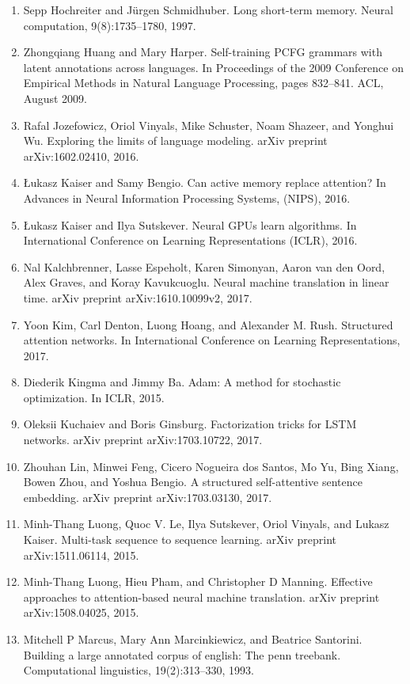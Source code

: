 \documentclass[11pt,UTF8,fontset=fandol]{ctexart}
\begin{document}
\begin{enumerate}[leftmargin=2.4em,labelsep=0.6em,itemsep=0.15em]
\item Sepp Hochreiter and J\"urgen Schmidhuber. Long short-term memory. Neural computation, 9(8):1735--1780, 1997.
\item Zhongqiang Huang and Mary Harper. Self-training PCFG grammars with latent annotations across languages. In Proceedings of the 2009 Conference on Empirical Methods in Natural Language Processing, pages 832--841. ACL, August 2009.
\item Rafal Jozefowicz, Oriol Vinyals, Mike Schuster, Noam Shazeer, and Yonghui Wu. Exploring the limits of language modeling. arXiv preprint arXiv:1602.02410, 2016.
\item {\L}ukasz Kaiser and Samy Bengio. Can active memory replace attention? In Advances in Neural Information Processing Systems, (NIPS), 2016.
\item {\L}ukasz Kaiser and Ilya Sutskever. Neural GPUs learn algorithms. In International Conference on Learning Representations (ICLR), 2016.
\item Nal Kalchbrenner, Lasse Espeholt, Karen Simonyan, Aaron van den Oord, Alex Graves, and Koray Kavukcuoglu. Neural machine translation in linear time. arXiv preprint arXiv:1610.10099v2, 2017.
\item Yoon Kim, Carl Denton, Luong Hoang, and Alexander M. Rush. Structured attention networks. In International Conference on Learning Representations, 2017.
\item Diederik Kingma and Jimmy Ba. Adam: A method for stochastic optimization. In ICLR, 2015.
\item Oleksii Kuchaiev and Boris Ginsburg. Factorization tricks for LSTM networks. arXiv preprint arXiv:1703.10722, 2017.
\item Zhouhan Lin, Minwei Feng, Cicero Nogueira dos Santos, Mo Yu, Bing Xiang, Bowen Zhou, and Yoshua Bengio. A structured self-attentive sentence embedding. arXiv preprint arXiv:1703.03130, 2017.
\item Minh-Thang Luong, Quoc V. Le, Ilya Sutskever, Oriol Vinyals, and Lukasz Kaiser. Multi-task sequence to sequence learning. arXiv preprint arXiv:1511.06114, 2015.
\item Minh-Thang Luong, Hieu Pham, and Christopher D Manning. Effective approaches to attention-based neural machine translation. arXiv preprint arXiv:1508.04025, 2015.
\item Mitchell P Marcus, Mary Ann Marcinkiewicz, and Beatrice Santorini. Building a large annotated corpus of english: The penn treebank. Computational linguistics, 19(2):313--330, 1993.

\end{enumerate}
\end{document}
